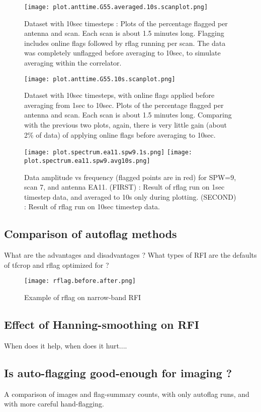 \begin{figure}
\texttt{[image: plot.anttime.G55.averaged.10s.scanplot.png]}
\caption{Dataset with 10sec timesteps : Plots of the percentage flagged per antenna and scan. Each scan is about 1.5 minutes long. Flagging includes online flags followed by rflag running per scan. The data was completely unflagged before averaging to 10sec, to simulate averaging within the correlator.}
\label{Fig:compare_4}
\end{figure}

\begin{figure}
\texttt{[image: plot.anttime.G55.10s.scanplot.png]}
\caption{Dataset with 10sec timesteps, with online flags applied before averaging from 1sec to 10sec.  Plots of the percentage flagged per antenna and scan. Each scan is about 1.5 minutes long. Comparing with the previous two plots, again, there is very little gain (about 2\% of data) of applying online flags before averaging to 10sec. }
\label{Fig:compare_5}
\end{figure}


\begin{figure}
\texttt{[image: plot.spectrum.ea11.spw9.1s.png]}
\texttt{[image: plot.spectrum.ea11.spw9.avg10s.png]}
\caption{Data amplitude vs frequency (flagged points are in red) for SPW=9, scan 7, and antenna EA11.  (FIRST) : Result of rflag run on 1sec timestep data, and averaged to 10s only during plotting.  (SECOND) : Result of rflag run on 10sec timestep data.}
\label{Fig:compare_6}
\end{figure}



\subsection{Comparison of autoflag methods}
What are the advantages and disadvantages ?  What types of RFI are the defaults of tfcrop and rflag optimized for ?  

\begin{figure}
\texttt{[image: rflag.before.after.png]}
\caption{Example of rflag on narrow-band RFI}
\end{figure}



\subsection{Effect of Hanning-smoothing on RFI}
When does it help, when does it hurt.... 

\subsection{Is auto-flagging good-enough for imaging ?}
A comparison of images and flag-summary counts,  with only autoflag runs, and with more careful hand-flagging. 





